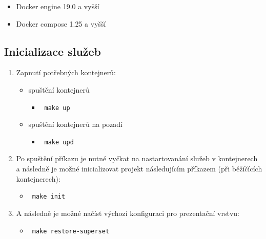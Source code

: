 \documentclass[10pt,a4paper,titlepage]{extarticle}
\begin{document}
    \begin{itemize}
        \itemsep1pt\parskip0pt
        \item Docker engine 19.0 a vyšší
        \item Docker compose 1.25 a vyšší
    \end{itemize}

    \subsection{Inicializace služeb}\label{initialization-of-services}

    \begin{enumerate}
        \def\labelenumi{\arabic{enumi}.}
        \itemsep1pt\parskip0pt
        \item Zapnutí potřebných kontejnerů:

        \begin{itemize}
            \itemsep1pt\parskip0pt

            \item spuštění kontejnerů

            \begin{itemize}
                \itemsep1pt\parskip0pt
                \item[] \texttt{\textdollar\ make up}
            \end{itemize}

            \item spuštění kontejnerů na pozadí

            \begin{itemize}
                \itemsep1pt\parskip0pt
                \item[] \texttt{\textdollar\ make upd}
            \end{itemize}
        \end{itemize}

        \item Po spuštění příkazu je nutné vyčkat na nastartovanání služeb v kontejnerech a následně je možné
        inicializovat projekt následujícím příkazem (při běžíčících kontejnerech):

        \begin{itemize}
            \itemsep1pt\parskip0pt
            \item[] \texttt{\textdollar\ make init}
        \end{itemize}

        \item A následně je možné načíst výchozí konfiguraci pro prezentační vrstvu:

        \begin{itemize}
            \itemsep1pt\parskip0pt
            \item[] \texttt{\textdollar\ make restore-superset}
        \end{itemize}
    \end{enumerate}
\end{document}
